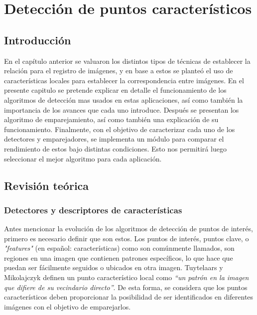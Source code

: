 \chapter{Detección de puntos característicos}
\label{capitulo3}


\section{Introducción}

En el capítulo anterior se valuaron los distintos tipos de técnicas de establecer la relación para el registro de imágenes, y en base a estos se planteó el uso de características locales para establecer la correspondencia entre imágenes. En el presente capitulo se pretende explicar en detalle el funcionamiento de los algoritmos de detección mas usados en estas aplicaciones, así como también la importancia de los avances que cada uno introduce. Después se presentan los algoritmo de emparejamiento, así como también una explicación de su funcionamiento. Finalmente, con el objetivo de caracterizar cada uno de los detectores y emparejadores, se implementa un módulo para comparar el rendimiento de estos bajo distintas condiciones. Esto nos permitirá luego seleccionar el mejor algoritmo para cada aplicación.

\section{Revisión teórica}

\subsection{Detectores y descriptores de características}

Antes mencionar la evolución de los algoritmos de detección de puntos de interés, primero es necesario definir que son estos. Los puntos de interés, puntos clave, o \textit{"features"} (en español: características) como son comúnmente llamados, son regiones en una imagen que contienen patrones específicos, lo que hace que puedan ser fácilmente seguidos o ubicados en otra imagen. Tuytelaars y Mikolajczyk \cite{Tuytelaars} definen un punto característico local como \textit{``un patrón en la imagen que difiere de su vecindario directo''}. De esta forma, se considera que los puntos característicos deben proporcionar la posibilidad de ser identificados en diferentes imágenes con el objetivo de emparejarlos.

